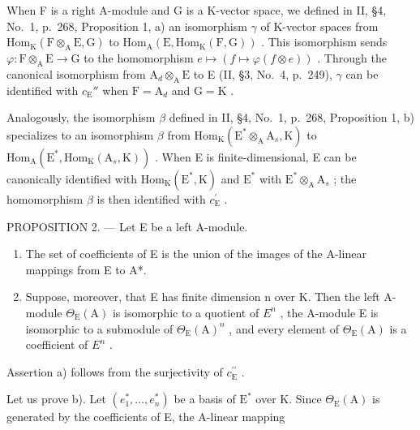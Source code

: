 When F is a right A-module and G is a K-vector space, we defined in II, §4, No.~1, p.~268, Proposition 1, a) an isomorphism \(\gamma\) of K-vector spaces from \(\mathrm{Hom}_{\mathrm{K}}(\mathrm{F} \otimes_{\mathrm{A}} \mathrm{E}, \mathrm{G})\) to \(\mathrm{Hom}_{\mathrm{A}}(\mathrm{E}, \mathrm{Hom}_{\mathrm{K}}(\mathrm{F}, \mathrm{G}))\) . This isomorphism sends \(\varphi : \mathrm{F} \otimes_{\mathrm{A}} \mathrm{E} \to \mathrm{G}\) to the homomorphism \(e \mapsto (f \mapsto \varphi(f \otimes e))\) . Through the canonical isomorphism from \(\mathrm{A}_d \otimes_{\mathrm{A}} \mathrm{E}\) to E (II, §3, No.~4, p.~249), \(\gamma\) can be identified with \(c_{\mathrm{E}}''\) when \(\mathrm{F} = \mathrm{A}_d\) and \(\mathrm{G} = \mathrm{K}\) .

Analogously, the isomorphism \(\beta\) defined in II, §4, No.~1, p.~268, Proposition 1, b) specializes to an isomorphism \(\beta\) from \(\mathrm{Hom}_{\mathrm{K}}(\mathrm{E}^{*}\otimes_{\mathrm{A}}\mathrm{A}_{s},\mathrm{K})\) to \(\mathrm{Hom}_{\mathrm{A}}(\mathrm{E}^{*},\mathrm{Hom}_{\mathrm{K}}(\mathrm{A}_{s},\mathrm{K}))\) . When E is finite-dimensional, E can be canonically identified with \(\mathrm{Hom}_{\mathrm{K}}(\mathrm{E}^{*},\mathrm{K})\) and \(\mathrm{E}^{*}\) with \(\mathrm{E}^{*}\otimes_{\mathrm{A}}\mathrm{A}_{s}\) ; the homomorphism \(\beta\) is then identified with \(c_{\mathrm{E}}^{\prime}\) .

PROPOSITION 2. --- Let E be a left A-module.

\begin{enumerate}
\def\labelenumi{\alph{enumi})}
\item
  The set of coefficients of E is the union of the images of the A-linear mappings from E to A*.
\item
  Suppose, moreover, that E has finite dimension n over K. Then the left A-module \(\Theta_{\mathrm{E}}(\mathrm{A})\) is isomorphic to a quotient of \(E^{n}\) , the A-module E is isomorphic to a submodule of \(\Theta_{\mathrm{E}}(\mathrm{A})^{n}\) , and every element of \(\Theta_{\mathrm{E}}(\mathrm{A})\) is a coefficient of \(E^{n}\) .
\end{enumerate}

Assertion a) follows from the surjectivity of \(c_{\mathrm{E}}^{\prime \prime}\) .

Let us prove b). Let \((e_1^*,\ldots ,e_n^*)\) be a basis of \(\mathrm{E}^*\) over K. Since \(\Theta_{\mathrm{E}}(\mathrm{A})\) is generated by the coefficients of E, the A-linear mapping

